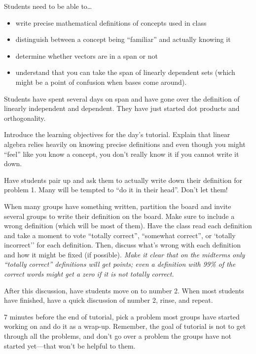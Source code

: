	Students need to be able to\ldots
	\begin{itemize}
		\item write precise mathematical definitions of concepts used in class
		\item distinguish between a concept being ``familiar'' and actually knowing it
		\item determine whether vectors are in a span or not
		\item understand that you can take the span of linearly dependent sets (which
			might be a point of confusion when bases come around).
	\end{itemize}

	Students have spent several days on span and have gone over the definition of linearly independent
		and dependent. They have just started dot products and orthogonality.

	Introduce the learning objectives for the day's tutorial. Explain that linear algebra relies
		heavily on knowing precise definitions and even though you might ``feel'' like
		you know a concept, you don't really know it if you cannot write it down.
	
	Have students pair up and ask them to actually write down their definition for problem 1.
	Many will be tempted to ``do it in their head''. Don't let them!

	When many groups have something written, partition the board and invite several groups to
	write their definition on the board. Make sure to include a wrong definition (which will be
	most of them). Have the class read each definition and take a moment to vote
	``totally correct'', ``somewhat correct'', or `totally incorrect'' for each definition.
	Then, discuss what's wrong with each definition and how it might be fixed (if possible).
	\emph{Make it clear that on the midterms only ``totally correct'' definitions will get points;
	even a definition with 99\% of the correct words might get a zero if it is not totally correct.}

	After this discussion, have students move on to number 2. When most students have finished,
		have a quick discussion of number 2, rinse, and repeat.
	
	7 minutes before the end of tutorial, pick a problem most groups have started working on
	and do it as a wrap-up. Remember, the goal of tutorial is not to get through all the problems,
	and don't go over a problem the groups have not started yet---that won't be helpful to them.



